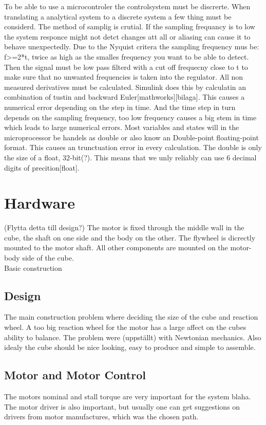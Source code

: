 \documentclass[a4paper,11pt]{kth-mag}
\begin{document}
To be able to use a microcontroler the controlsystem must be discrerte. When translating a analytical system to a 
discrete system a few thing must be considerd. The method of samplig is crutial. If the sampling frequancy is to 
low the system responce might not detct changes att all or aliasing can cause it to behave unexpectedly. Due to the 
Nyquist critera the sampling frequency mus be: f>=2*t, twice as high as the smalles frequency you want to be able to
detect. Then the signal must be low pass filterd with a cut off frequecny close to t to make sure that no unwanted
frequencies is taken into the regulator.
All non measured derivatives must be calculated. Simulink does this by calculatin an combination of tustin and 
backward Euler[mathworks][bilaga]. This causes a numerical error depending on the step in time. And the time step
in turn depends on the sampling frequency, too low frequency causes a big stem in time which leads to large numerical 
errors.
Most variables and states will in the microprocessor be handels as double or also know an Double-point floating-point
format. This causes an trunctuation error in every calculation. The double is only the size of a float, 32-bit(?). This
means that we unly reliably can use 6 decimal digits of precition[float].

\section{Hardware}
(Flytta detta till design?)
The motor is fixed through the middle wall in the cube, the shaft on one side and the body on the other. The flywheel is dicrectly mounted to the motor shaft. All other components are mounted on the motor-body side of the cube.
\\ Basic construction

\subsection{Design}
The main construction problem where deciding the size of the cube and reaction wheel. A too big reaction wheel for the motor has a large affect on the cubes ability to balance. The problem were (uppställt) with Newtonian mechanics.
Also idealy the cube should be nice looking, easy to produce and simple to assemble. 
 
\subsection{Motor and Motor Control}
The motors nominal and stall torque are very important for the system blaha. The motor driver is also important, but usually one can get suggestions on drivers from motor manufactures, which was the chosen path.
  
\end{document}
